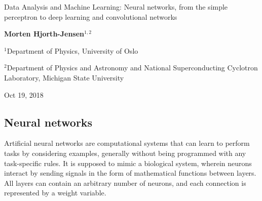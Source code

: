 \documentclass[%
oneside,                 %
final,                   %
10pt]{article}
\begin{document}

\newcommand{\exercisesection}[1]{\subsection*{#1}}






\thispagestyle{empty}

\begin{center}
{\LARGE\bf
\begin{spacing}{1.25}
Data Analysis and Machine Learning: Neural networks, from the simple perceptron to deep learning and convolutional networks
\end{spacing}
}
\end{center}


\begin{center}
{\bf Morten Hjorth-Jensen${}^{1, 2}$} \\ [0mm]
\end{center}

\begin{center}
\centerline{{\small ${}^1$Department of Physics, University of Oslo}}
\centerline{{\small ${}^2$Department of Physics and Astronomy and National Superconducting Cyclotron Laboratory, Michigan State University}}
\end{center}
    

\begin{center}
Oct 19, 2018
\end{center}

\vspace{1cm}


\subsection{Neural networks}

Artificial neural networks are computational systems that can learn to
perform tasks by considering examples, generally without being
programmed with any task-specific rules. It is supposed to mimic a
biological system, wherein neurons interact by sending signals in the
form of mathematical functions between layers. All layers can contain
an arbitrary number of neurons, and each connection is represented by
a weight variable.
\end{document}
